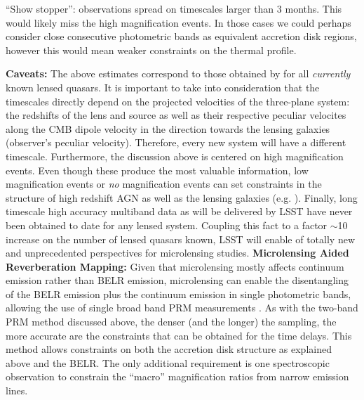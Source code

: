 ``Show stopper'': observations spread on timescales larger than 3 months.
This would likely miss the high magnification events. In those cases
we could perhaps consider close consecutive photometric bands as
equivalent accretion disk regions, however this would mean weaker
constraints on the thermal profile.

{\bf Caveats:} The above estimates correspond to those obtained by 
\citet{MosqueraandKochanek2011} for all \emph{currently} known lensed quasars. 
It is important to take into consideration that the timescales directly depend 
on the projected velocities of the three-plane system: the redshifts of the lens 
and source as well as their respective peculiar velocites along the CMB dipole 
velocity in the direction towards the lensing galaxies (observer's peculiar 
velocity). Therefore, every new system will have a different timescale. 
Furthermore, the discussion above is centered on high magnification events. Even 
though these produce the most valuable information, low magnification events or 
\emph{no} magnification events can set constraints in the structure of high 
redshift AGN as well as the lensing galaxies (e.g. \citealt{gilmerino2005}). 
Finally, long timescale high accuracy multiband data as will be delivered by 
LSST have never been obtained to date for any lensed system. Coupling this fact 
to a factor $\sim$10 increase on the number of lensed quasars known, LSST will 
enable of totally new and unprecedented perspectives for microlensing studies.
%
{\bf Microlensing Aided Reverberation Mapping:} Given that microlensing mostly 
affects continuum emission rather than BELR emission, microlensing can enable 
the disentangling of the BELR emission plus the continuum emission in single 
photometric bands, allowing the use of single broad band PRM measurements 
\citep{SluseandTewes2014}. As with the two-band PRM method discussed above, the 
denser (and the longer) the sampling, the more accurate are the constraints that 
can be obtained for the time delays. This method allows constraints on both the 
accretion disk structure as explained above and the BELR. The only additional 
requirement is one spectroscopic observation to constrain the ``macro'' 
magnification ratios from narrow emission lines.

